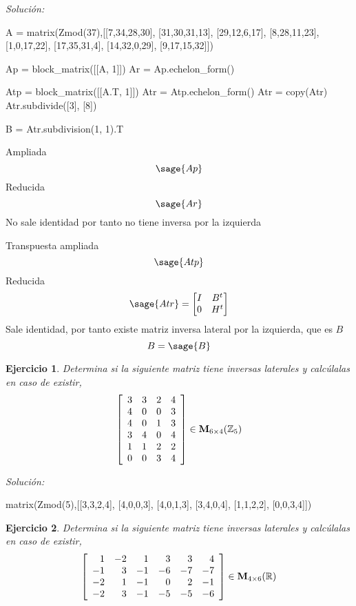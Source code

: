 \documentclass{amsart}
\newtheorem{ejer}{Ejercicio}
\begin{document}
{\it Soluci\'on:}

\begin{sageblock}
A = matrix(Zmod(37),[[7,34,28,30],
[31,30,31,13],
[29,12,6,17],
[8,28,11,23],
[1,0,17,22],
[17,35,31,4],
[14,32,0,29],
[9,17,15,32]])

Ap = block_matrix([[A, 1]])
Ar = Ap.echelon_form()

Atp = block_matrix([[A.T, 1]])
Atr = Atp.echelon_form()
Atr = copy(Atr)
Atr.subdivide([3], [8])

B = Atr.subdivision(1, 1).T
\end{sageblock}

Ampliada
$$
	\sage{Ap}
$$
Reducida
$$
	\sage{Ar}
$$
No sale identidad por tanto no tiene inversa por la izquierda

Transpuesta ampliada
$$
	\sage{Atp}
$$
Reducida
$$
	\sage{Atr} = \begin{bmatrix}
		I & B^t \\
		0 & H^t \\
	\end{bmatrix}
$$
Sale identidad, por tanto existe matriz inversa lateral por la izquierda, que es $B$
$$
	B = \sage{B}
$$




\begin{ejer} Determina si la siguiente matriz tiene inversas laterales y calc\'ulalas en caso de existir,
\[ \left[\begin{array}{rrrr}
3 & 3 & 2 & 4 \\
4 & 0 & 0 & 3 \\
4 & 0 & 1 & 3 \\
3 & 4 & 0 & 4 \\
1 & 1 & 2 & 2 \\
0 & 0 & 3 & 4
\end{array}\right] \in {\bf M}_{6\times 4}({\mathbb Z}_{5})\]
\end{ejer}

{\it Soluci\'on:}

\begin{sageblock}
matrix(Zmod(5),[[3,3,2,4],
[4,0,0,3],
[4,0,1,3],
[3,4,0,4],
[1,1,2,2],
[0,0,3,4]])
\end{sageblock}



\begin{ejer} Determina si la siguiente matriz tiene inversas laterales y calc\'ulalas en caso de existir,
\[ \left[\begin{array}{rrrrrr}
1 & -2 & 1 & 3 & 3 & 4 \\
-1 & 3 & -1 & -6 & -7 & -7 \\
-2 & 1 & -1 & 0 & 2 & -1 \\
-2 & 3 & -1 & -5 & -5 & -6
\end{array}\right] \in {\bf M}_{4\times 6}({\mathbb R})\]
\end{ejer}
\end{document}
